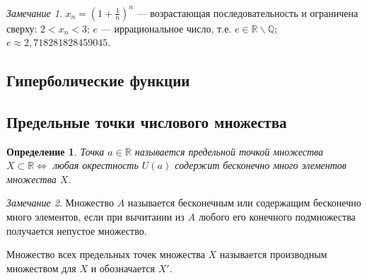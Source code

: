 \documentclass[a4paper,12pt]{article} %
\newtheorem{definition}{Определение}[section]
\theoremstyle{remark}
\newtheorem*{remark}{Замечание}
\theoremstyle{definition}
\begin{document}
\begin{remark}
	$x_n = (1 + \frac{1}{n})^{n}$ --- возрастающая последовательность и ограничена сверху: $2<x_n<3$; $e$ --- иррациональное число, т.е. $e\in \mathbb{R}\backslash\mathbb{Q}$; $e \approx 2,718281828459045$.
	
\end{remark}

\subsection{Гиперболические функции}
\subsection{Предельные точки числового множества}
\begin{definition}
	Точка $a\in \mathbb{R}$ называется предельной точкой множества $X\subset \mathbb{R} \iff$ любая окрестность $U(a)$ содержит бесконечно много элементов множества $X$.
\end{definition}
\begin{remark}
	Множество $A$ называется бесконечным или содержащим бесконечно много элементов, если при вычитании из $A$ любого его конечного подмножества получается непустое множество.
\end{remark}

Множество всех предельных точек множества $X$ называется производным множеством для $X$ и обозначается $X'$.
\end{document}
